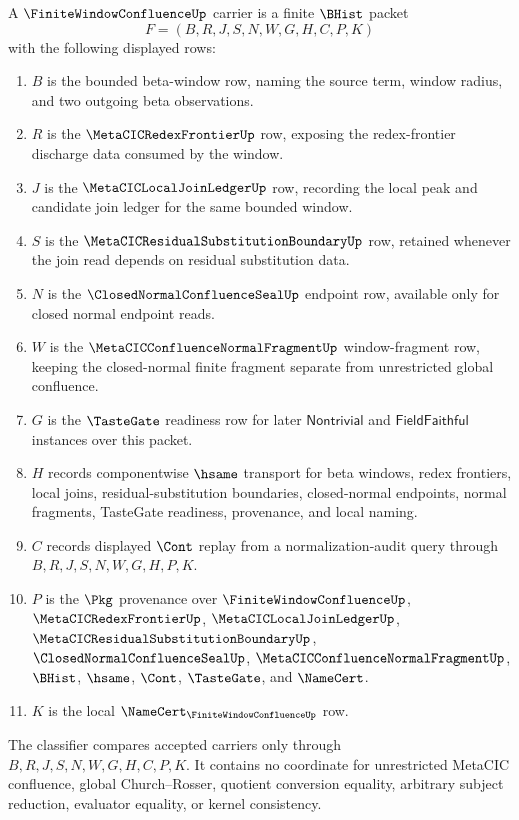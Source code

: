 \begin{definition}
\label{def:finite-window-confluence-carrier}
A $\FiniteWindowConfluenceUp$ carrier is a finite $\BHist$ packet
$$
F=(B,R,J,S,N,W,G,H,C,P,K)
$$
with the following displayed rows:
\begin{enumerate}
\item $B$ is the bounded beta-window row, naming the source term, window radius, and two outgoing beta observations.
\item $R$ is the $\MetaCICRedexFrontierUp$ row, exposing the redex-frontier discharge data consumed by the window.
\item $J$ is the $\MetaCICLocalJoinLedgerUp$ row, recording the local peak and candidate join ledger for the same bounded window.
\item $S$ is the $\MetaCICResidualSubstitutionBoundaryUp$ row, retained whenever the join read depends on residual substitution data.
\item $N$ is the $\ClosedNormalConfluenceSealUp$ endpoint row, available only for closed normal endpoint reads.
\item $W$ is the $\MetaCICConfluenceNormalFragmentUp$ window-fragment row, keeping the closed-normal finite fragment separate from unrestricted global confluence.
\item $G$ is the $\TasteGate$ readiness row for later $\mathsf{Nontrivial}$ and $\mathsf{FieldFaithful}$ instances over this packet.
\item $H$ records componentwise $\hsame$ transport for beta windows, redex frontiers, local joins, residual-substitution boundaries, closed-normal endpoints, normal fragments, TasteGate readiness, provenance, and local naming.
\item $C$ records displayed $\Cont$ replay from a normalization-audit query through $B,R,J,S,N,W,G,H,P,K$.
\item $P$ is the $\Pkg$ provenance over $\FiniteWindowConfluenceUp$, $\MetaCICRedexFrontierUp$, $\MetaCICLocalJoinLedgerUp$, $\MetaCICResidualSubstitutionBoundaryUp$, $\ClosedNormalConfluenceSealUp$, $\MetaCICConfluenceNormalFragmentUp$, $\BHist$, $\hsame$, $\Cont$, $\TasteGate$, and $\NameCert$.
\item $K$ is the local $\NameCert_{\FiniteWindowConfluenceUp}$ row.
\end{enumerate}
The classifier compares accepted carriers only through $B,R,J,S,N,W,G,H,C,P,K$. It contains no coordinate for unrestricted MetaCIC confluence, global Church--Rosser, quotient conversion equality, arbitrary subject reduction, evaluator equality, or kernel consistency.
\end{definition}


